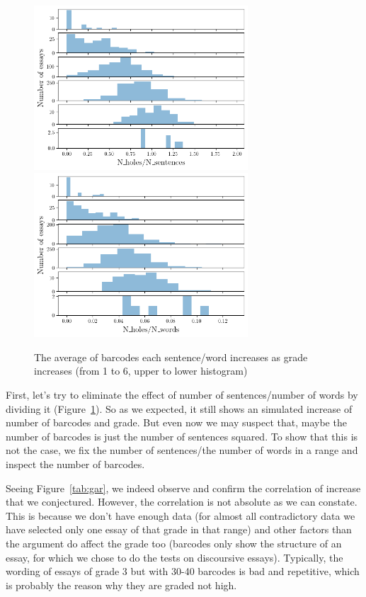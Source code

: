 \begin{figure}[H]
  \includegraphics[width=8cm]{gradesah1s.png}
  \includegraphics[width=8cm]{gradesah1w.png}
  \caption{The average of barcodes each sentence/word increases as grade increases (from 1 to 6, upper to lower histogram)}
  \label{fig:ads}
\end{figure}

First, let's try to eliminate the effect of number of sentences/number of words
by dividing it (Figure~\ref{fig:ads}). So as we expected, it still shows an simulated
increase of number of barcodes and grade. But even now we may suspect that,
maybe the number of barcodes is just the number of sentences squared. To show that
this is not the case, we fix the number of sentences/the number of words in a range
and inspect the number of barcodes.



Seeing Figure~\ref{tab:gar}, we indeed observe and confirm the correlation of increase
that we conjectured. However, the correlation is not absolute as we can constate.
This is because we don't have enough data (for almost all contradictory data
we have selected only one essay of that grade in that range) and other factors than the argument
do affect the grade too (barcodes only show the structure of an essay, for which we
chose to do the tests on discoursive essays). Typically, the wording
of essays of grade 3 but with 30-40 barcodes is bad and repetitive, which is
probably the reason why they are graded not high.

